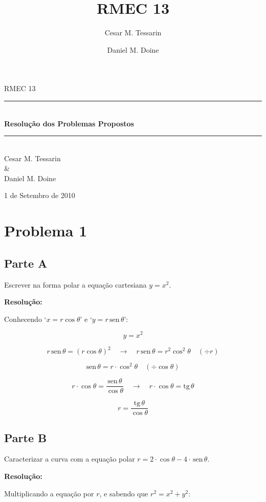 \documentclass[a4paper,12pt,final]{article}
\title{RMEC 13}
\author{Cesar M. Tessarin \and Daniel M. Doine}
\newcommand{\HRule}{\rule{\linewidth}{0.5mm}}
\newcommand{\qrq}{\quad\rightarrow\quad}
\newcommand{\sen}{\textrm{sen}}
\newcommand{\tg}{\textrm{tg}}
\begin{document}
\begin{titlepage}
  \begin{center}

  \LARGE RMEC 13\\[1cm]

  \HRule\\[0.5cm]
  {\huge \bfseries Resolução dos Problemas Propostos}
  \HRule \\[8cm]

  Cesar M. Tessarin\\
  {\large \&}\\
  Daniel M. Doine

  \vfill

  {\large 1 de Setembro de 2010}

  \end{center}
\end{titlepage}

\section*{Problema 1}

\subsection*{Parte A}

Escrever na forma polar a equação cartesiana $y = x^2$.

\textbf{Resolução:}

Conhecendo `$x = r\cos\theta$' e `$y = r\,\sen\,\theta$':

$$
y = x^2
$$

$$
r\,\sen\,\theta = (r\cos\theta)^2 \qrq
r\,\sen\,\theta = r^2\cos^2\theta\quad(\div r)
$$

$$
\sen\,\theta = r\cdot\cos^2\theta\quad(\div \cos\theta)
$$

$$
r\cdot \cos\theta =
  \frac{\sen\,\theta}{\cos\theta} \qrq
r\cdot\cos\theta = \tg\,\theta
$$

$$
\boxed{r = \frac{\tg\,\theta}{\cos\theta}}
$$

\subsection*{Parte B}

Caracterizar a curva com a equação polar
$r = 2\cdot\cos\theta - 4\cdot\,\sen\,\theta$.

\textbf{Resolução:}

Multiplicando a equação por $r$, e sabendo que $r^2 = x^2 + y^2$:
\end{document}
